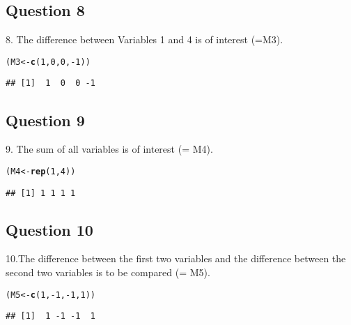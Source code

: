 \documentclass{article}\usepackage[]{graphicx}\usepackage[]{color}
\makeatletter
\newcommand{\hlnum}[1]{\textcolor[rgb]{0.686,0.059,0.569}{#1}}%
\newcommand{\hlopt}[1]{\textcolor[rgb]{0,0,0}{#1}}%
\newcommand{\hlstd}[1]{\textcolor[rgb]{0.345,0.345,0.345}{#1}}%
\newcommand{\hlkwb}[1]{\textcolor[rgb]{0.69,0.353,0.396}{#1}}%
\newcommand{\hlkwd}[1]{\textcolor[rgb]{0.737,0.353,0.396}{\textbf{#1}}}%
\newenvironment{kframe}{%
 \def\at@end@of@kframe{}%
 \ifinner\ifhmode%
  \def\at@end@of@kframe{\end{minipage}}%
  \begin{minipage}{\columnwidth}%
 \fi\fi%
 \def\FrameCommand##1{\hskip\@totalleftmargin \hskip-\fboxsep
 \colorbox{shadecolor}{##1}\hskip-\fboxsep
     \hskip-\linewidth \hskip-\@totalleftmargin \hskip\columnwidth}%
 \MakeFramed {\advance\hsize-\width
   \@totalleftmargin\z@ \linewidth\hsize
   \@setminipage}}%
 {\par\unskip\endMakeFramed%
 \at@end@of@kframe}
\newenvironment{knitrout}{}{} %
\makeatother
\begin{document}
\subsection{Question 8}
8. The difference between Variables 1 and 4 is of interest (=M3).  
\begin{knitrout}
\color{fgcolor}\begin{kframe}
\begin{alltt}
\hlstd{(M3} \hlkwb{<-} \hlkwd{c}\hlstd{(}\hlnum{1}\hlstd{,} \hlnum{0}\hlstd{,} \hlnum{0}\hlstd{,} \hlopt{-}\hlnum{1}\hlstd{))}
\end{alltt}
\begin{verbatim}
## [1]  1  0  0 -1
\end{verbatim}
\end{kframe}
\end{knitrout}

\subsection{Question 9}
9. The sum of all variables is of interest (= M4).
\begin{knitrout}
\color{fgcolor}\begin{kframe}
\begin{alltt}
\hlstd{(M4} \hlkwb{<-} \hlkwd{rep}\hlstd{(}\hlnum{1}\hlstd{,}\hlnum{4}\hlstd{))}
\end{alltt}
\begin{verbatim}
## [1] 1 1 1 1
\end{verbatim}
\end{kframe}
\end{knitrout}


\subsection{Question 10}
10.The difference between the first two variables and the difference between the second two variables is to be compared (= M5).
\begin{knitrout}
\color{fgcolor}\begin{kframe}
\begin{alltt}
\hlstd{(M5} \hlkwb{<-} \hlkwd{c}\hlstd{(}\hlnum{1}\hlstd{,} \hlopt{-}\hlnum{1}\hlstd{,} \hlopt{-}\hlnum{1}\hlstd{,} \hlnum{1}\hlstd{))}
\end{alltt}
\begin{verbatim}
## [1]  1 -1 -1  1
\end{verbatim}
\end{kframe}
\end{knitrout}
\end{document}
